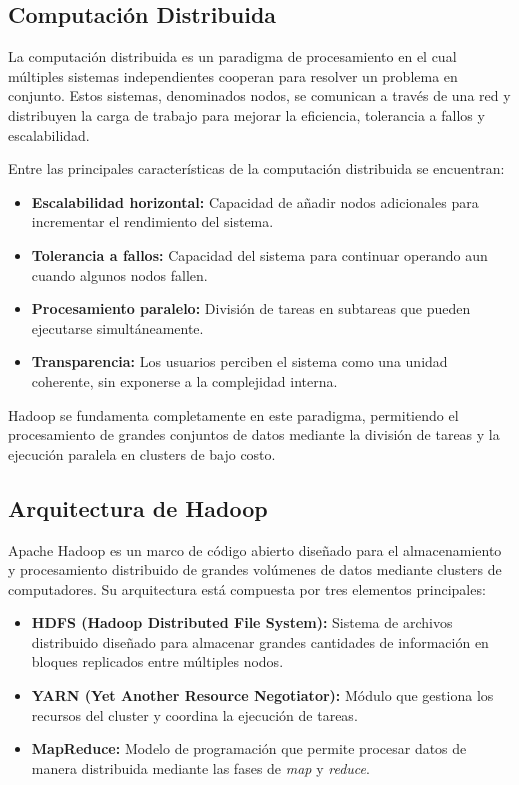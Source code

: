 \subsection{Computación Distribuida}

La computación distribuida es un paradigma de procesamiento en el cual múltiples sistemas independientes cooperan para resolver un problema en conjunto. Estos sistemas, denominados nodos, se comunican a través de una red y distribuyen la carga de trabajo para mejorar la eficiencia, tolerancia a fallos y escalabilidad.

Entre las principales características de la computación distribuida se encuentran:

\begin{itemize}
    \item \textbf{Escalabilidad horizontal:} Capacidad de añadir nodos adicionales para incrementar el rendimiento del sistema.
    \item \textbf{Tolerancia a fallos:} Capacidad del sistema para continuar operando aun cuando algunos nodos fallen.
    \item \textbf{Procesamiento paralelo:} División de tareas en subtareas que pueden ejecutarse simultáneamente.
    \item \textbf{Transparencia:} Los usuarios perciben el sistema como una unidad coherente, sin exponerse a la complejidad interna.
\end{itemize}

Hadoop se fundamenta completamente en este paradigma, permitiendo el procesamiento de grandes conjuntos de datos mediante la división de tareas y la ejecución paralela en clusters de bajo costo.

\subsection{Arquitectura de Hadoop}

Apache Hadoop es un marco de código abierto diseñado para el almacenamiento y procesamiento distribuido de grandes volúmenes de datos mediante clusters de computadores. Su arquitectura está compuesta por tres elementos principales:

\begin{itemize}
    \item \textbf{HDFS (Hadoop Distributed File System):} Sistema de archivos distribuido diseñado para almacenar grandes cantidades de información en bloques replicados entre múltiples nodos.
    \item \textbf{YARN (Yet Another Resource Negotiator):} Módulo que gestiona los recursos del cluster y coordina la ejecución de tareas.
    \item \textbf{MapReduce:} Modelo de programación que permite procesar datos de manera distribuida mediante las fases de \textit{map} y \textit{reduce}.
\end{itemize}

